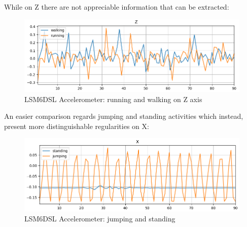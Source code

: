 While on Z there are not appreciable information that can be extracted:
\begin{figure}[H]
	\hfill\includegraphics[scale=0.8]{figures/plot_ACC_LSM6DSL_DS_walking_running_Z.png}\hspace*{\fill}
	\caption{LSM6DSL Accelerometer: running and walking on Z axis}\label{fig:9}
	\centering
\end{figure}
An easier comparison regards jumping and standing activities which instead, present more distinguishable regularities on X:
\begin{figure}[H]
		\hfill\includegraphics[scale=0.8]{figures/plot_ACC_LSM6DSL_DS_standing_jumping_X.png}\hspace*{\fill}
		\caption{LSM6DSL Accelerometer: jumping and standing}\label{fig:10}
		\centering
\end{figure} 

